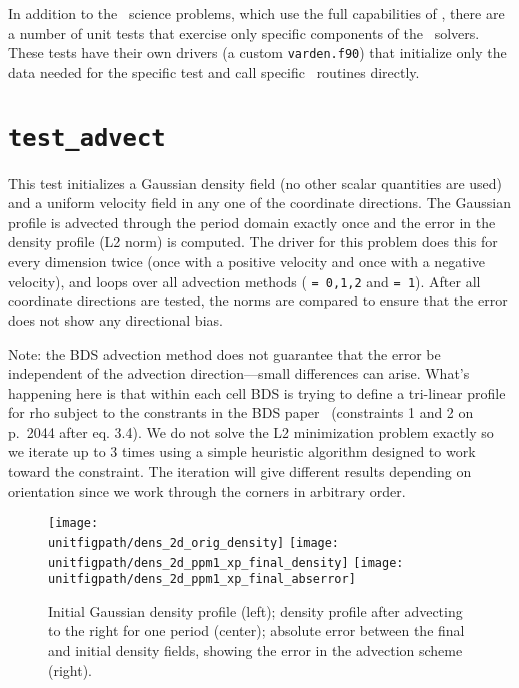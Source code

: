 
\label{chapter:unit_tests}

In addition to the \maestro\ science problems, which use the full
capabilities of \maestro, there are a number of unit tests that
exercise only specific components of the \maestro\ solvers.  These
tests have their own drivers (a custom {\tt varden.f90}) that
initialize only the data needed for the specific test and call
specific \maestro\ routines directly.


\section {\tt test\_advect}

  This test initializes a Gaussian density field (no other scalar
  quantities are used) and a uniform velocity field in any one of the
  coordinate directions.  The Gaussian profile is advected through the
  period domain exactly once and the error in the density profile (L2
  norm) is computed.  The driver for this problem does this for every
  dimension twice (once with a positive velocity and once with a
  negative velocity), and loops over all advection methods
  ( {\tt = 0,1,2} and  {\tt = 1}).  After
  all coordinate directions are tested, the norms are compared to
  ensure that the error does not show any directional bias.

  Note: the BDS advection method does not guarantee that the error be
  independent of the advection direction---small differences can
  arise.  What's happening here is that within each cell BDS is trying
  to define a tri-linear profile for rho subject to the constrants in
  the BDS paper~\cite{bds3d} (constraints 1 and 2 on p.\ 2044 after eq. 3.4).  We
  do not solve the L2 minimization problem exactly so we iterate up to
  3 times using a simple heuristic algorithm designed to work toward
  the constraint.  The iteration will give different results depending
  on orientation since we work through the corners in arbitrary order.

\begin{figure}[t] 
\centering
\texttt{[image: \\unitfigpath/dens\_2d\_orig\_density]}
\texttt{[image: \\unitfigpath/dens\_2d\_ppm1\_xp\_final\_density]}
\texttt{[image: \\unitfigpath/dens\_2d\_ppm1\_xp\_final\_abserror]} 
%
\caption[Results of the {\tt test\_advect} unit test]{\label{fig:unit:advtest}
  Initial Gaussian density profile (left); density profile after
  advecting to the right for one period (center); absolute error
  between the final and initial density fields, showing the error in
  the advection scheme (right).}
\end{figure}


